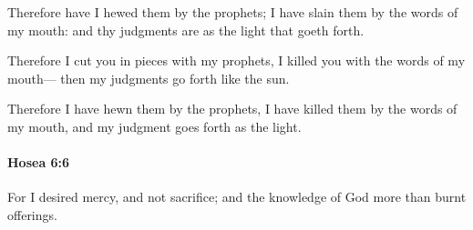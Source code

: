 			\begin{versebox}
					\item[BHS] 
					\item[LXX] 
					\item[ASV] Therefore have I hewed them by the prophets; I have slain them by the words of my mouth: and thy judgments are as the light that goeth forth.
					\item[NIV] Therefore I cut you in pieces with my prophets, I killed you with the words of my mouth— then my judgments go forth like the sun.
					\item[NRSV] Therefore I have hewn them by the prophets, I have killed them by the words of my mouth, and my judgment goes forth as the light.
			\end{versebox}

		\paragraph{Hosea 6:6} %
			\label{HOSEA-6-6}

			For I desired mercy, and not sacrifice; and the knowledge of God more than burnt offerings.

